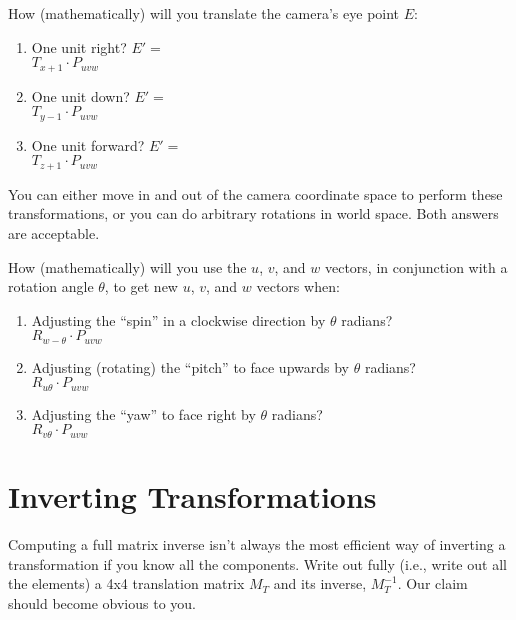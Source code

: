 \documentclass[10pt,twocolumn]{article}
\begin{document}
\begin{framed}
\noindent {\bf [1/2 pt. each]} How (mathematically) will you translate the camera's eye point $E$:
\begin{enumerate}
\item One unit right? $E' = $\\
    $T_{x+1} \cdot P_{uvw}$\\
\item One unit down? $E' = $\\
    $T_{y-1} \cdot P_{uvw}$\\
\item One unit forward? $E' = $\\
    $T_{z+1} \cdot P_{uvw}$\\
\end{enumerate}
\end{framed}

\noindent You can either move in and out of the camera coordinate space to perform these transformations, or you can do arbitrary rotations in world space. Both answers are acceptable.

\begin{framed}
\noindent {\bf [1/2 pt. each]} How (mathematically) will you use the $u$, $v$, and $w$ vectors, in conjunction with a rotation angle $\theta$, to get new $u$, $v$, and $w$ vectors when:
\begin{enumerate}
\item Adjusting the ``spin'' in a clockwise direction by $\theta$ radians?\\
    $R_{w-\theta} \cdot P_{uvw}$\\
\item Adjusting (rotating) the ``pitch'' to face upwards by $\theta$ radians?\\
    $R_{u\theta} \cdot P_{uvw}$\\
\item Adjusting the ``yaw'' to face right by $\theta$ radians?\\
    $R_{v\theta} \cdot P_{uvw}$\\
\end{enumerate}
\end{framed}

\section{Inverting Transformations}
\begin{framed}
\noindent {\bf [1 point]} Computing a full matrix inverse isn't always the most efficient way of inverting a transformation if you know all the components. Write out fully (i.e., write out all the elements) a 4x4 translation matrix $M_T$ and its inverse, $M^{-1}_T$. Our claim should become obvious to you.
\end{framed}
\end{document}
